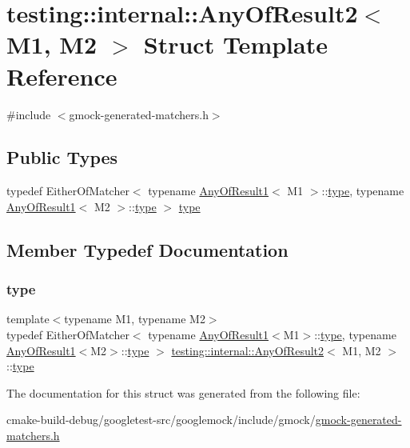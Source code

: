 \hypertarget{structtesting_1_1internal_1_1AnyOfResult2}{}\section{testing\+::internal\+::Any\+Of\+Result2$<$ M1, M2 $>$ Struct Template Reference}
\label{structtesting_1_1internal_1_1AnyOfResult2}


{\ttfamily \#include $<$gmock-\/generated-\/matchers.\+h$>$}

\subsection*{Public Types}
\begin{DoxyCompactItemize}
\item 
typedef Either\+Of\+Matcher$<$ typename \mbox{\hyperlink{structtesting_1_1internal_1_1AnyOfResult1}{Any\+Of\+Result1}}$<$ M1 $>$\+::\mbox{\hyperlink{structtesting_1_1internal_1_1AnyOfResult2_a6d9eba508021f8e652c7c154a649073f}{type}}, typename \mbox{\hyperlink{structtesting_1_1internal_1_1AnyOfResult1}{Any\+Of\+Result1}}$<$ M2 $>$\+::\mbox{\hyperlink{structtesting_1_1internal_1_1AnyOfResult2_a6d9eba508021f8e652c7c154a649073f}{type}} $>$ \mbox{\hyperlink{structtesting_1_1internal_1_1AnyOfResult2_a6d9eba508021f8e652c7c154a649073f}{type}}
\end{DoxyCompactItemize}


\subsection{Member Typedef Documentation}
\mbox{\label{structtesting_1_1internal_1_1AnyOfResult2_a6d9eba508021f8e652c7c154a649073f}} 
\subsubsection{\texorpdfstring{type}{type}}
{\footnotesize\ttfamily template$<$typename M1, typename M2$>$ \\
typedef Either\+Of\+Matcher$<$ typename \mbox{\hyperlink{structtesting_1_1internal_1_1AnyOfResult1}{Any\+Of\+Result1}}$<$M1$>$\+::\mbox{\hyperlink{structtesting_1_1internal_1_1AnyOfResult2_a6d9eba508021f8e652c7c154a649073f}{type}}, typename \mbox{\hyperlink{structtesting_1_1internal_1_1AnyOfResult1}{Any\+Of\+Result1}}$<$M2$>$\+::\mbox{\hyperlink{structtesting_1_1internal_1_1AnyOfResult2_a6d9eba508021f8e652c7c154a649073f}{type}} $>$ \mbox{\hyperlink{structtesting_1_1internal_1_1AnyOfResult2}{testing\+::internal\+::\+Any\+Of\+Result2}}$<$ M1, M2 $>$\+::\mbox{\hyperlink{structtesting_1_1internal_1_1AnyOfResult2_a6d9eba508021f8e652c7c154a649073f}{type}}}



The documentation for this struct was generated from the following file\+:\begin{DoxyCompactItemize}
\item 
cmake-\/build-\/debug/googletest-\/src/googlemock/include/gmock/\mbox{\hyperlink{gmock-generated-matchers_8h}{gmock-\/generated-\/matchers.\+h}}\end{DoxyCompactItemize}
